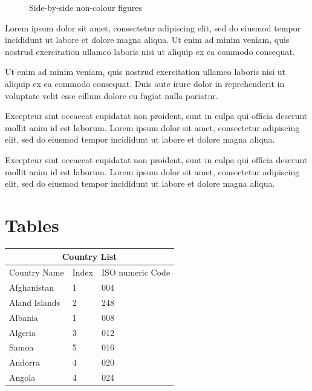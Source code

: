\documentclass[10pt,conference,a4paper,onecolumn] {IEEEtran}
\begin{document}
\begin{multicols}{2}
\begin{figure}[H]
\centering
{}
\qquad
{}
\caption{Side-by-side non-colour figures}
\label{scen}
\end{figure}

Lorem ipsum dolor sit amet, consectetur adipiscing elit, sed do eiusmod tempor incididunt ut labore et dolore magna aliqua. Ut enim ad minim veniam, quis nostrud exercitation ullamco laboris nisi ut aliquip ex ea commodo consequat. 

Ut enim ad minim veniam, quis nostrud exercitation ullamco laboris nisi ut aliquip ex ea commodo consequat. Duis aute irure dolor in reprehenderit in voluptate velit esse cillum dolore eu fugiat nulla pariatur.

Excepteur sint occaecat cupidatat non proident, sunt in culpa qui officia deserunt mollit anim id est laborum. Lorem ipsum dolor sit amet, consectetur adipiscing elit, sed do eiusmod tempor incididunt ut labore et dolore magna aliqua.

Excepteur sint occaecat cupidatat non proident, sunt in culpa qui officia deserunt mollit anim id est laborum. Lorem ipsum dolor sit amet, consectetur adipiscing elit, sed do eiusmod tempor incididunt ut labore et dolore magna aliqua. 

\section{Tables}

\begin{tabular}{ |p{2.5cm}||p{1cm}|p{3cm}| }
 \hline
 \multicolumn{3}{|c|}{Country List} \\
 \hline
 Country Name & Index & ISO numeric Code\\
 \hline
 Afghanistan & 1 & 004\\
 Aland Islands & 2 & 248\\
 Albania & 1 & 008\\
 Algeria & 3 & 012\\
 Samoa & 5 & 016\\
 Andorra & 4 & 020\\
 Angola & 4 & 024\\
 \hline
\end{tabular}





\end{multicols}
\end{document}
